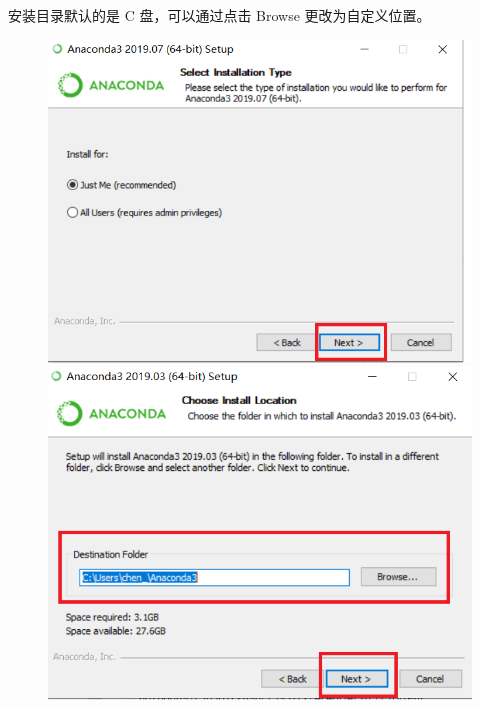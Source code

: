 安装目录默认的是 C 盘，可以通过点击 Browse 更改为自定义位置。


\begin{figure}[!ht]
  \centering
  \includegraphics[scale=0.5]{figure/chapter1/anaconda9.png}\quad
  \includegraphics[scale=0.5]{figure/chapter1/anaconda3.png}
\end{figure}

